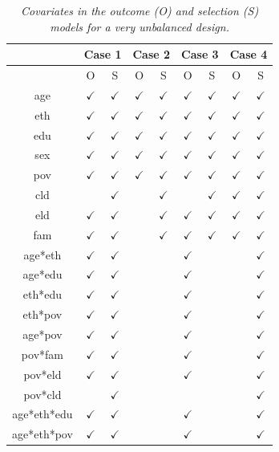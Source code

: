 \documentclass[11pt]{article}
\begin{document}
\begin{table}
\begin{center}
\begin{tabular}{c|cc|cc|cc|cc}
&\multicolumn{2}{|c|}{Case 1}&\multicolumn{2}{|c|}{Case 2}&\multicolumn{2}{|c|}{Case 3}&\multicolumn{2}{c}{Case 4}\\
\hline
&O&S&O&S&O&S&O&S\\
age&$\checkmark$&$\checkmark$&$\checkmark$&$\checkmark$&$\checkmark$&$\checkmark$&$\checkmark$&$\checkmark$\\
eth&$\checkmark$&$\checkmark$&$\checkmark$&$\checkmark$&$\checkmark$&$\checkmark$&$\checkmark$&$\checkmark$\\
edu&$\checkmark$&$\checkmark$&$\checkmark$&$\checkmark$&$\checkmark$&$\checkmark$&$\checkmark$&$\checkmark$\\
sex&$\checkmark$&$\checkmark$&$\checkmark$&$\checkmark$&$\checkmark$&$\checkmark$&$\checkmark$&$\checkmark$\\
pov&$\checkmark$&$\checkmark$&$\checkmark$&$\checkmark$&$\checkmark$&$\checkmark$&$\checkmark$&$\checkmark$\\
cld&&$\checkmark$&&$\checkmark$&&$\checkmark$&$\checkmark$&$\checkmark$\\
eld&$\checkmark$&$\checkmark$&&$\checkmark$&$\checkmark$&$\checkmark$&$\checkmark$&$\checkmark$\\
fam&$\checkmark$&$\checkmark$&&$\checkmark$&$\checkmark$&$\checkmark$&$\checkmark$&$\checkmark$\\
age*eth&$\checkmark$&$\checkmark$&&&$\checkmark$&&&$\checkmark$\\
age*edu&$\checkmark$&$\checkmark$&&&$\checkmark$&&&$\checkmark$\\
eth*edu&$\checkmark$&$\checkmark$&&&$\checkmark$&& &$\checkmark$\\
eth*pov&$\checkmark$&$\checkmark$&&&$\checkmark$&&&$\checkmark$\\
age*pov&$\checkmark$&$\checkmark$&&&$\checkmark$&&&$\checkmark$\\
pov*fam&$\checkmark$&$\checkmark$&&&$\checkmark$&&&$\checkmark$\\
pov*eld&$\checkmark$&$\checkmark$&&&$\checkmark$&&&$\checkmark$\\
pov*cld&&$\checkmark$&&&&&&$\checkmark$\\
age*eth*edu&$\checkmark$&$\checkmark$&&&$\checkmark$&&&$\checkmark$\\
age*eth*pov&$\checkmark$&$\checkmark$&&&$\checkmark$&&&$\checkmark$
\end{tabular}
\end{center}
\caption{\em Covariates in the outcome (O) and selection (S) models for a very unbalanced design.}
\label{s2-design}
\end{table}
\end{document}
